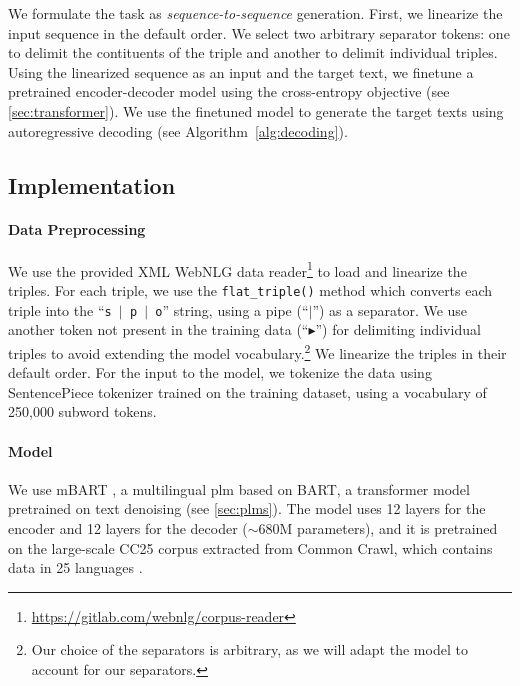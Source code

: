 We formulate the task as \emph{sequence-to-sequence} generation. First, we linearize the input sequence in the default order. We select two arbitrary separator tokens: one to delimit the contituents of the triple and another to delimit individual triples. Using the linearized sequence as an input and the target text, we finetune a pretrained encoder-decoder model using the cross-entropy objective (see \autoref{sec:transformer}). We use the finetuned model to generate the target texts using autoregressive decoding (see Algorithm~\ref{alg:decoding}).

% 


\subsection{Implementation}
\paragraph{Data Preprocessing} We use the provided XML WebNLG data reader\footnote{\url{https://gitlab.com/webnlg/corpus-reader}} to load and linearize the triples. For each triple, we use the \texttt{flat\_triple()} method which converts each triple into the ``\texttt{s $\vert$ p $\vert$ o}'' string, using a pipe (``$\vert$'') as a separator. We use another token not present in the training data (``$\blacktriangleright$'') for delimiting individual triples to avoid extending the model vocabulary.\footnote{Our choice of the separators is arbitrary, as we will adapt the model to account for our separators.
} We linearize the triples in their default order. For the input to the model, we tokenize the data using SentencePiece tokenizer \citep{kudo2018sentencepiece} trained on the training dataset, using a vocabulary of 250,000 subword tokens.

\paragraph{Model}
We use mBART \cite{liuMultilingualDenoisingPretraining2020}, a multilingual \ac{plm} based on BART, a transformer model pretrained on text denoising (see \autoref{sec:plms}).
The model uses 12 layers for the encoder and 12 layers for the decoder ($\sim$680M parameters), and it is pretrained on the large-scale CC25 corpus extracted from Common Crawl, which contains data in 25 languages \citep{wenzek2020ccnet}.



